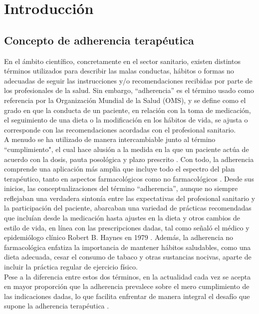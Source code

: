 \chapter{Introducción}

\section{Concepto de adherencia terapéutica}
En el ámbito científico, concretamente en el sector sanitario, existen distintos términos utilizados para describir las malas conductas, hábitos o formas no adecuadas de seguir las instrucciones y/o recomendaciones recibidas por parte de los profesionales de la salud. Sin embargo, ``adherencia'' es el término usado como referencia por la Organización Mundial de la Salud (OMS), y se define como el grado en que la conducta de un paciente, en relación con la toma de medicación, el seguimiento de una dieta o la modificación en los hábitos de vida, se ajusta o corresponde con las recomendaciones acordadas con el profesional sanitario. \cite{who2003adherence}  \\

A menudo se ha utilizado de manera intercambiable \cite{ibarra2017adherencia} junto al término ``cumplimiento", el cual hace alusión a la medida en la que un paciente actúa de acuerdo con la dosis, pauta posológica y plazo prescrito \cite{farmaindustria2023adherencia}. Con todo, la adherencia comprende una aplicación más amplia que incluye todo el espectro del plan terapéutico, tanto en aspectos farmacológicos como no farmacológicos \cite{libroblanco2021}. Desde sus inicios, las conceptualizaciones del término ``adherencia'', aunque no siempre reflejaban una verdadera sintonía entre las expectativas del profesional sanitario y la participación del paciente, abarcaban una variedad de prácticas recomendadas que incluían desde la medicación hasta ajustes en la dieta y otros cambios de estilo de vida, en línea con las prescripciones dadas, tal como señaló el médico y epidemiólogo clínico Robert B. Haynes en 1979 \cite{libroblanco2021}. Además, la adherencia no farmacológica enfatiza la importancia de mantener hábitos saludables, como una dieta adecuada, cesar el consumo de tabaco y otras sustancias nocivas, aparte de incluir la práctica regular de ejercicio físico.\\

Pese a la diferencia entre estos dos términos, en la actualidad cada vez se acepta en mayor proporción que la adherencia prevalece sobre el mero cumplimiento de las indicaciones dadas, lo que facilita enfrentar de manera integral el desafío que supone la adherencia terapéutica \cite{farmaindustria2023adherencia}.


